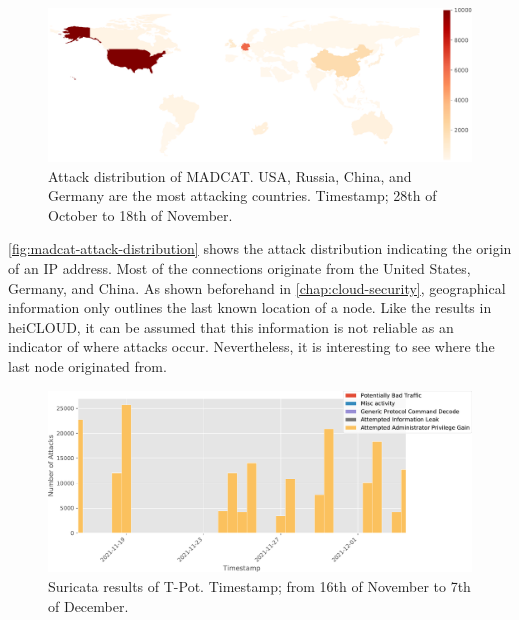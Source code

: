 \begin{figure}[ht]
    \centering
    \includegraphics[width=\textwidth]{figures/madcat-overview-map.pdf}
    \caption[Attack distribution of MADCAT]{
        Attack distribution of MADCAT.
        USA, Russia, China, and Germany are the most attacking countries.
        Timestamp; 28th of October to 18th of November.
    }
    \label{fig:madcat-attack-distribution}
\end{figure}

\autoref{fig:madcat-attack-distribution} shows the attack distribution indicating the origin of an IP address.
Most of the connections originate from the United States, Germany, and China.
As shown beforehand in \autoref{chap:cloud-security}, geographical information only outlines the last known location of a node.
Like the results in heiCLOUD, it can be assumed that this information is not reliable as an indicator of where attacks occur.
Nevertheless, it is interesting to see where the last node originated from.

\begin{figure}[ht]
    \centering
    \includegraphics[width=\textwidth]{figures/madcat-suricata-alerts.pdf}
    \caption[Suricata results of T-Pot]{
        Suricata results of T-Pot.
        Timestamp; from 16th of November to 7th of December.
    }
    \label{fig:suricata-distribution}
\end{figure}


